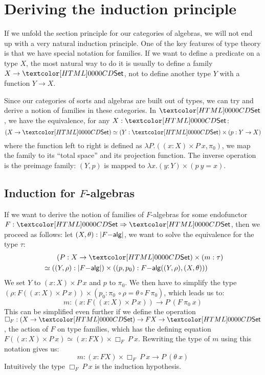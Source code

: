 \section{Deriving the induction principle}

If we unfold the section principle for our categories of algebras, we
will not end up with a very natural induction principle. One of the
key features of type theory is that we have special notation for
families. If we want to define a predicate on a type $X$, the most 
natural way to do it is usually to define a family $X \to \Set$, not
to define another type $Y$ with a function $Y \to X$. 

Since our categories of sorts and algebras are built out of types, we
can try and derive a notion of families in these categories. In
$\Set$, we have the equivalence, for any $X : \Set$:
$$
(X \to \Set) \simeq (Y : \Set) \times (p : Y \to X)
$$
where the function left to right is defined as
$\lambda P . ((x : X) \times P\ x , \pi_0)$, \ie we map the family to
its ``total space'' and its projection function. The inverse operation
is the preimage family: $(Y,p)$ is mapped to
$\lambda x . (y : Y) \times (p\ y = x)$. 

\subsection{Induction for $F$-algebras}
If we want to derive the notion of families of $F$-algebras for some
endofunctor $F : \Func{\Set}{\Set}$, then we proceed as follows: let
$(X,\theta) : | F\mathsf{-alg} |$, we want to solve the equivalence for
the type $\tau$:
%
\begin{align*}
&\ \ \ \ \ \ (P : X \to \Set) \times (m : \tau) \\
&\simeq ((Y,\rho) : | \algcat{F} |) \times ((p,p_0) : \algcat{F}((Y,\rho),(X,\theta)))  
\end{align*}
%
We set $Y$ to $(x : X) \times P\ x$ and $p$ to $\pi_0$. We then have
to simplify the type
$(\rho : F ((x : X) \times P\ x)) \times (p_0 : \pi_0\ \circ \rho =
\theta \circ F\ \pi_0)$, which leads us to:
$$
m : (x : F ((x : X) \times P\ x)) \to P\ (F\ \pi_0\ x)
$$
This can be simplified even further if we define the operation
$\Box_F : (X \to \Set) \to FX \to \Set$, \ie the action of $F$ on type
families, which has the defining equation
$F ((x : X) \times P\ x) \simeq (x : FX) \times \Box_F\ P\
x$. Rewriting the type of $m$ using this notation gives us:
$$
m : (x : FX) \times \Box_F\ P\ x \to P\ (\theta\ x)
$$
Intuitively the type $\Box_F\ P\ x$ is the induction hypothesis.

